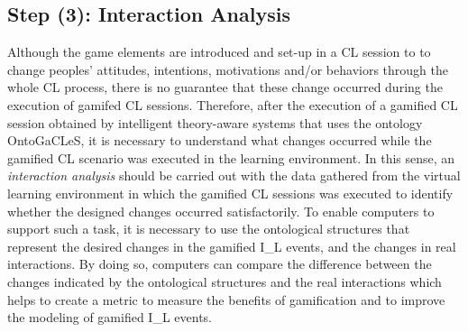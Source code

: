 \newpage

\subsection*{Step (3): Interaction Analysis}

Although the game elements are introduced and set-up in a CL session to to change peoples’ attitudes, intentions, motivations and/or behaviors through the whole CL process, there is no guarantee that these change occurred during the execution of gamifed CL sessions. Therefore, after the execution of a gamified CL session obtained by intelligent theory-aware systems that uses the ontology OntoGaCLeS, it is necessary to understand what changes occurred while the gamified CL scenario was executed in the learning environment. In this sense, an \emph{interaction analysis} should be carried out with the data gathered from the virtual learning environment in which the gamified CL sessions was executed to identify whether the designed changes occurred satisfactorily. To enable computers to support such a task, it is necessary to use the ontological structures that represent the desired changes in the gamified I\_L events, and the changes in real interactions. By doing so, computers can compare the difference between the changes indicated by the ontological structures and the real interactions which helps to create a metric to measure the benefits of gamification and to improve the modeling of gamified I\_L events.

